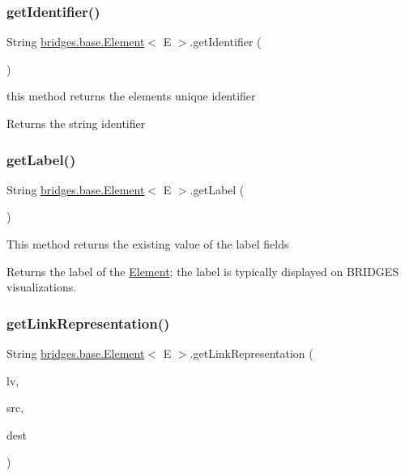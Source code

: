\subsubsection{\texorpdfstring{getIdentifier()}{getIdentifier()}}
{\footnotesize\ttfamily String \mbox{\hyperlink{classbridges_1_1base_1_1_element}{bridges.\+base.\+Element}}$<$ E $>$.get\+Identifier (\begin{DoxyParamCaption}{ }\end{DoxyParamCaption})}

this method returns the element\textquotesingle{}s unique identifier \begin{DoxyReturn}{Returns}
the string identifier 
\end{DoxyReturn}
\mbox{\label{classbridges_1_1base_1_1_element_a5c831a0238de487765f6021a887f1542}} 
\subsubsection{\texorpdfstring{getLabel()}{getLabel()}}
{\footnotesize\ttfamily String \mbox{\hyperlink{classbridges_1_1base_1_1_element}{bridges.\+base.\+Element}}$<$ E $>$.get\+Label (\begin{DoxyParamCaption}{ }\end{DoxyParamCaption})}

This method returns the existing value of the label fields

\begin{DoxyReturn}{Returns}
the label of the \mbox{\hyperlink{classbridges_1_1base_1_1_element}{Element}}; the label is typically displayed on B\+R\+I\+D\+G\+ES visualizations. 
\end{DoxyReturn}
\mbox{\label{classbridges_1_1base_1_1_element_ae32deb37d1ad95d2fdfaa616062f319d}} 
\subsubsection{\texorpdfstring{getLinkRepresentation()}{getLinkRepresentation()}}
{\footnotesize\ttfamily String \mbox{\hyperlink{classbridges_1_1base_1_1_element}{bridges.\+base.\+Element}}$<$ E $>$.get\+Link\+Representation (\begin{DoxyParamCaption}\item[{\mbox{\hyperlink{classbridges_1_1base_1_1_link_visualizer}{Link\+Visualizer}}}]{lv,  }\item[{String}]{src,  }\item[{String}]{dest }\end{DoxyParamCaption})}


